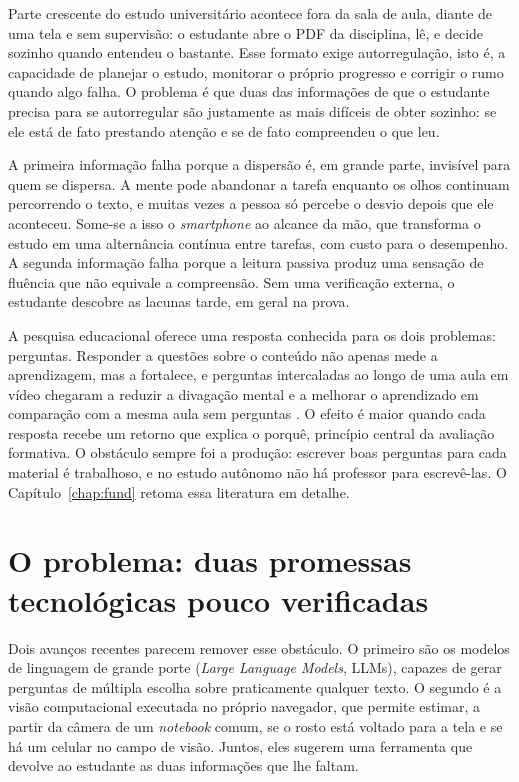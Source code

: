 \documentclass[portuguese,oneside]{tcc}
\newcommand{\estr}[1]{\emph{#1}}
\begin{document}
Parte crescente do estudo universitário acontece fora da sala de aula, diante de uma tela e sem supervisão: o estudante abre o PDF da disciplina, lê, e decide sozinho quando entendeu o bastante. Esse formato exige autorregulação, isto é, a capacidade de planejar o estudo, monitorar o próprio progresso e corrigir o rumo quando algo falha. O problema é que duas das informações de que o estudante precisa para se autorregular são justamente as mais difíceis de obter sozinho: se ele está de fato prestando atenção e se de fato compreendeu o que leu.

A primeira informação falha porque a dispersão é, em grande parte, invisível para quem se dispersa. A mente pode abandonar a tarefa enquanto os olhos continuam percorrendo o texto, e muitas vezes a pessoa só percebe o desvio depois que ele aconteceu. Some-se a isso o \estr{smartphone} ao alcance da mão, que transforma o estudo em uma alternância contínua entre tarefas, com custo para o desempenho. A segunda informação falha porque a leitura passiva produz uma sensação de fluência que não equivale a compreensão. Sem uma verificação externa, o estudante descobre as lacunas tarde, em geral na prova.

A pesquisa educacional oferece uma resposta conhecida para os dois problemas: perguntas. Responder a questões sobre o conteúdo não apenas mede a aprendizagem, mas a fortalece, e perguntas intercaladas ao longo de uma aula em vídeo chegaram a reduzir a divagação mental e a melhorar o aprendizado em comparação com a mesma aula sem perguntas \cite{SKS13}. O efeito é maior quando cada resposta recebe um retorno que explica o porquê, princípio central da avaliação formativa. O obstáculo sempre foi a produção: escrever boas perguntas para cada material é trabalhoso, e no estudo autônomo não há professor para escrevê-las. O Capítulo~\ref{chap:fund} retoma essa literatura em detalhe.

\section{O problema: duas promessas tecnológicas pouco verificadas}

Dois avanços recentes parecem remover esse obstáculo. O primeiro são os modelos de linguagem de grande porte (\estr{Large Language Models}, LLMs), capazes de gerar perguntas de múltipla escolha sobre praticamente qualquer texto. O segundo é a visão computacional executada no próprio navegador, que permite estimar, a partir da câmera de um \estr{notebook} comum, se o rosto está voltado para a tela e se há um celular no campo de visão. Juntos, eles sugerem uma ferramenta que devolve ao estudante as duas informações que lhe faltam.
\end{document}
